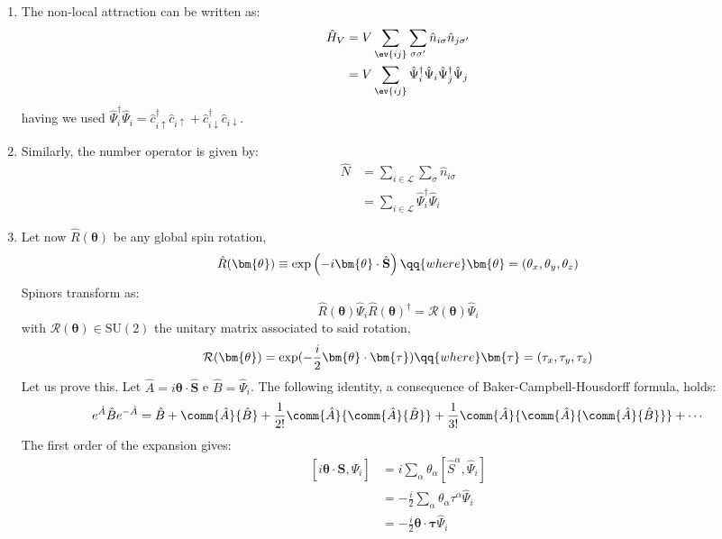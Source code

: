 \begin{enumerate}
	\item The non-local attraction can be written as:
	\begin{align}
		\hat H_V &= V\sum_{\ev{ij}} \sum_{\sigma\sigma'} \hat n_{i\sigma} \hat n_{j\sigma'} \nonumber \\
		&= V\sum_{\ev{ij}} \hat \Psi_i^\dagger \hat \Psi_i \hat \Psi_j^\dagger \hat \Psi_j \label{eq:ehm-HV-4xPsi}
	\end{align}
	having we used $\hat \Psi_i^\dagger \hat \Psi_i = \hat c_{i\uparrow}^\dagger \hat c_{i\uparrow} + \hat c_{i\downarrow}^\dagger \hat c_{i\downarrow}$.
	\item Similarly, the number operator is given by:
	\begin{align}
		\hat N &= \sum_{i \in \mathcal{L}} \sum_{\sigma} \hat n_{i\sigma} \nonumber \\
		&= \sum_{i \in \mathcal{L}} \hat \Psi_i^\dagger \hat \Psi_i \label{eq:ehm-N-2xPsi}
	\end{align}
	\item Let now $\hat R(\bm{\theta})$ be any global spin rotation,
	\[
		\hat R (\bm{\theta}) \equiv \exp \left(-i \bm{\theta} \cdot \hat{\mathbf{S}}\right)
		\qq{where}
		\bm{\theta} = (\theta_x,\theta_y,\theta_z)
	\]
	Spinors transform as:
	\[
		\hat R (\bm{\theta}) \hat \Psi_i \hat R (\bm{\theta})^\dagger = \mathcal{R}(\bm{\theta}) \hat \Psi_i
	\]
	with $\mathcal{R}(\bm{\theta}) \in \mathrm{SU}(2)$ the unitary matrix associated to said rotation,
	\begin{equation}\label{eq:ehm-R-exp}
		\mathcal{R}(\bm{\theta}) = \exp(- \frac{i}{2} \bm{\theta} \cdot \bm{\tau})
		\qq{where}
		\bm{\tau} = (\tau_x,\tau_y,\tau_z)
	\end{equation}
	Let us prove this. Let $\hat A = i \bm{\theta} \cdot \hat{\mathbf{S}}$ e $\hat B = \hat \Psi_i$. The following identity, a consequence of Baker-Campbell-Housdorff formula, holds:
	\[
		e^{\hat A} \hat B e^{-\hat A} = \hat B + \comm{\hat A}{\hat B} + \frac{1}{2!} \comm{\hat A}{ \comm{\hat A}{\hat B}} + \frac{1}{3!} \comm{\hat A}{\comm{\hat A}{\comm{\hat A}{\hat B}}} + \cdots
	\]
	The first order of the expansion gives:
	\[
	\begin{aligned}
		[i \bm{\theta} \cdot \hat{\mathbf{S}}, \hat \Psi_i] &= i \sum_\alpha \theta_\alpha [\hat S^\alpha, \hat \Psi_i] \\
		&= -\frac{i}{2} \sum_\alpha \theta_\alpha \tau^\alpha \hat{\Psi}_i \\
		&= -\frac{i}{2} \bm{\theta} \cdot \bm{\tau} \hat \Psi_i

\end{aligned}\]
\end{enumerate}
